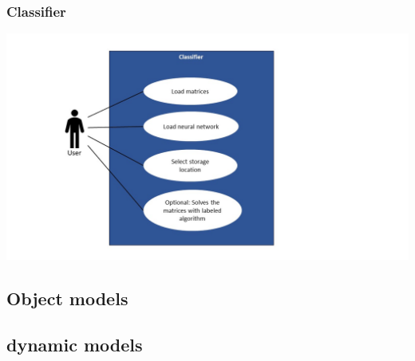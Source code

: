\documentclass[parskip=full]{scrartcl}
\begin{document}
\subsubsection{Classifier}
\includegraphics[width=1.3\textwidth]{useCase_Classifier}
\subsection{Object models}
\subsection{dynamic models}
\end{document}
